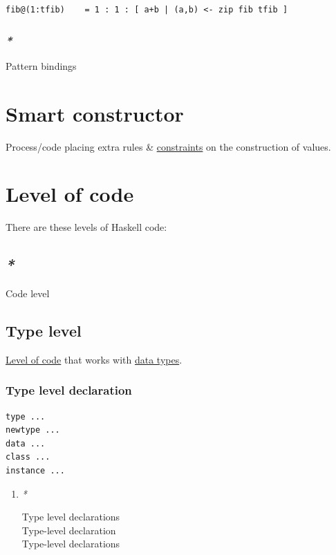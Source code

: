 \documentclass[a4paper,14pt,oneside]{book}
\begin{document}
\begin{verbatim}
fib@(1:tfib)    = 1 : 1 : [ a+b | (a,b) <- zip fib tfib ]
\end{verbatim}

\subsubsection{\emph{*}}
\label{sec:org6c0ca14}

\label{org8af75cd}Pattern bindings\\

\section{\label{org2e1ff8b}Smart constructor}
\label{sec:org394c29e}
Process/code placing extra rules \& \hyperref[orga719142]{constraints} on the construction of values.\\

\section{\label{org643d692}Level of code}
\label{sec:orgee82648}
There are these levels of Haskell code:\\

\subsection{\emph{*}}
\label{sec:org2ec88a1}

\label{org153bb67}Code level\\

\subsection{\label{orgc61a8a3}Type level}
\label{sec:org9794044}
\hyperref[org643d692]{Level of code} that works with \hyperref[org6e40766]{data types}.\\

\subsubsection{\label{orgdf70f61}Type level declaration}
\label{sec:org0e0fb03}
\begin{verbatim}
type ...
newtype ...
data ...
class ...
instance ...
\end{verbatim}

\begin{enumerate}
\item \emph{*}
\label{sec:orgd575492}

\label{org228cd1d}Type level declarations\\
\label{org0b29891}Type-level declaration\\
\label{org9bc9dc7}Type-level declarations\\
\end{enumerate}
\end{document}
